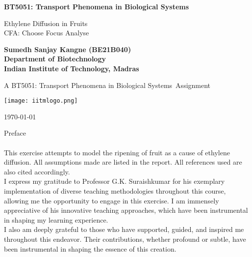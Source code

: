 \documentclass[10pt, a4paper]{article}
\newcommand\course{BT5051: Transport Phenomena in Biological Systems}                            %
\newcommand\Information{Sumedh Sanjay Kangne (BE21B040) \\ Department of Biotechnology \\ Indian Institute of Technology, Madras}                        %
\begin{document}
\begin{titlepage}
    \begin{center}
        \vspace*{3cm}
            
        \Huge
        \textbf{BT5051: Transport Phenomena in Biological Systems}
            
        \vspace{1cm}
        \huge
        Ethylene Diffusion in Fruits \\
        \Large
        CFA: Choose Focus Analyse
            
        \vspace{1.5cm}
        \Large
            
        \textbf{\Information}                      %
        
            
        \vfill
        
        A \course \ Assignment
            
        \vspace{1cm}
            
        \texttt{[image: iitmlogo.png]}
        \\
        
        \Large
        
        \today
            
    \end{center}
\end{titlepage}

\newpage
\huge

\begin{center}
    Preface\\
    \\
    \large
    This exercise attempts to model the ripening of fruit as a cause of ethylene diffusion. All assumptions made are listed in the report. All references used are also cited accordingly.\\
    I express my gratitude to Professor G.K. Suraishkumar for his exemplary implementation of diverse teaching methodologies throughout this course, allowing me the opportunity to engage in this exercise. I am immensely appreciative of his innovative teaching approaches, which have been instrumental in shaping my learning experience.\\
    I also am deeply grateful to those who have supported, guided, and inspired me throughout this endeavor. Their contributions, whether profound or subtle, have been instrumental in shaping the essence of this creation.
\end{center}
\end{document}
